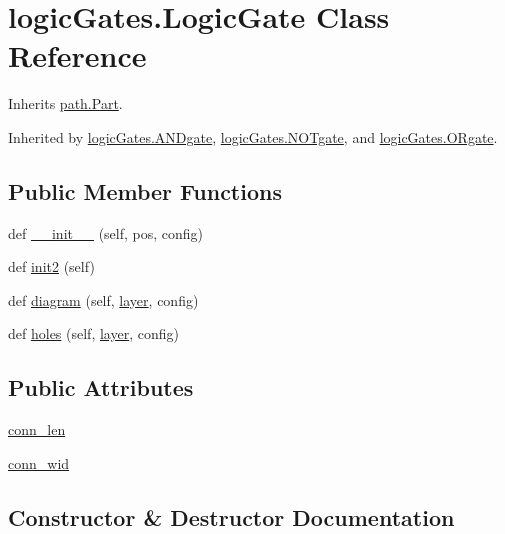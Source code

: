 \hypertarget{classlogic_gates_1_1_logic_gate}{}\section{logic\+Gates.\+Logic\+Gate Class Reference}
\label{classlogic_gates_1_1_logic_gate}


Inherits \hyperlink{classpath_1_1_part}{path.\+Part}.



Inherited by \hyperlink{classlogic_gates_1_1_a_n_dgate}{logic\+Gates.\+A\+N\+Dgate}, \hyperlink{classlogic_gates_1_1_n_o_tgate}{logic\+Gates.\+N\+O\+Tgate}, and \hyperlink{classlogic_gates_1_1_o_rgate}{logic\+Gates.\+O\+Rgate}.

\subsection*{Public Member Functions}
\begin{DoxyCompactItemize}
\item 
def \hyperlink{classlogic_gates_1_1_logic_gate_ada12c5194b562a1928ed72d76291fba4}{\+\_\+\+\_\+init\+\_\+\+\_\+} (self, pos, config)
\item 
def \hyperlink{classlogic_gates_1_1_logic_gate_ac4b0b533ccc70bef86d528e2413c64a7}{init2} (self)
\item 
def \hyperlink{classlogic_gates_1_1_logic_gate_a24577fd2fb6106be52e1cccd3a85888b}{diagram} (self, \hyperlink{classpath_1_1_part_aa1d9912dfa1d7e3222df898d2a18786f}{layer}, config)
\item 
def \hyperlink{classlogic_gates_1_1_logic_gate_a6c0ac3a4339841ad5ddfeb8059404ccf}{holes} (self, \hyperlink{classpath_1_1_part_aa1d9912dfa1d7e3222df898d2a18786f}{layer}, config)
\end{DoxyCompactItemize}
\subsection*{Public Attributes}
\begin{DoxyCompactItemize}
\item 
\hyperlink{classlogic_gates_1_1_logic_gate_a4c75447bac7b94a545d9089459fbcce3}{conn\+\_\+len}
\item 
\hyperlink{classlogic_gates_1_1_logic_gate_ad2e7099b8ce947b455ad6177c40e0204}{conn\+\_\+wid}
\end{DoxyCompactItemize}


\subsection{Constructor \& Destructor Documentation}
\hypertarget{classlogic_gates_1_1_logic_gate_ada12c5194b562a1928ed72d76291fba4}{}

